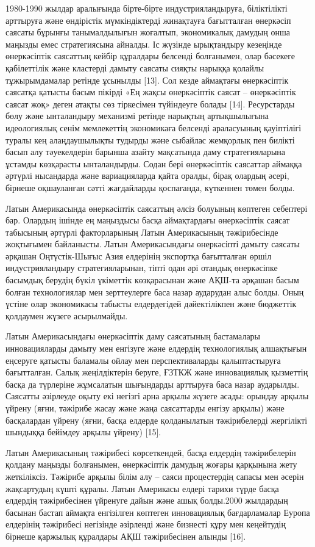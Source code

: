 \begin{multicols}{2}
1980-1990 жылдар аралығында бірте-бірте индустрияландыруға, біліктілікті
арттыруға және өндірістік мүмкіндіктерді жинақтауға бағытталған
өнеркәсіп саясаты бұрынғы танымалдылығын жоғалтып, экономикалық дамудың
онша маңызды емес стратегиясына айналды. Іс жүзінде ырықтандыру
кезеңінде өнеркәсіптік саясаттың кейбір құралдары белсенді болғанымен,
олар бәсекеге қабілеттілік және кластерді дамыту саясаты сияқты нарыққа
қолайлы тұжырымдамалар ретінде ұсынылды {[}13{]}. Сол кезде аймақтағы
өнеркәсіптік саясатқа қатысты басым пікірді «Ең жақсы өнеркәсіптік
саясат -- өнеркәсіптік саясат жоқ» деген атақты сөз тіркесімен
түйіндеуге болады {[}14{]}. Ресурстарды бөлу және ынталандыру механизмі
ретінде нарықтың артықшылығына идеологиялық сенім мемлекеттің
экономикаға белсенді араласуының қауіптілігі туралы кең алаңдаушылықты
тудырды және сыбайлас жемқорлық пен билікті басып алу тәуекелдерін
барынша азайту мақсатында даму стратегияларына ұстамды көзқарасты
ынталандырды. Содан бері өнеркәсіптік саясаттар аймаққа әртүрлі
нысандарда және вариацияларда қайта оралды, бірақ олардың әсері, бірнеше
оқшауланған сәтті жағдайларды қоспағанда, күткеннен төмен болды.

Латын Америкасында өнеркәсіптік саясаттың әлсіз болуының көптеген
себептері бар. Олардың ішінде ең маңыздысы басқа аймақтардағы
өнеркәсіптік саясат табысының әртүрлі факторларының Латын Америкасының
тәжірибесінде жоқтығымен байланысты. Латын Америкасындағы өнеркәсіпті
дамыту саясаты әрқашан Оңтүстік-Шығыс Азия елдерінің экспортқа
бағытталған өршіл индустрияландыру стратегияларынан, тіпті одан әрі
отандық өнеркәсіпке басымдық берудің бүкіл үкіметтік көзқарасынан және
АҚШ-та әрқашан басым болған технологиялар мен зерттеулерге баса назар
аударудан алыс болды. Оның үстіне олар экономикасы табысты елдердегідей
дәйектілікпен және бюджеттік қолдаумен жүзеге асырылмайды.

Латын Америкасындағы өнеркәсіптік даму саясатының бастамалары
инновацияларды дамыту мен енгізуге және елдердің технологиялық
алшақтығын еңсеруге қатысты баламалы ойлау мен перспективаларды
қалыптастыруға бағытталған. Салық жеңілдіктерін беруге, ҒЗТКЖ және
инновациялық қызметтің басқа да түрлеріне жұмсалатын шығындарды
арттыруға баса назар аударылды. Саясатты әзірлеуде оқыту екі негізгі
арна арқылы жүзеге асады: орындау арқылы үйрену (яғни, тәжірибе жасау
және жаңа саясаттарды енгізу арқылы) және басқалардан үйрену (яғни,
басқа елдерде қолданылатын тәжірибелерді жергілікті шындыққа бейімдеу
арқылы үйрену) {[}15{]}.

Латын Америкасының тәжірибесі көрсеткендей, басқа елдердің тәжірибелерін
қолдану маңызды болғанымен, өнеркәсіптік дамудың жоғары қарқынына жету
жеткіліксіз. Тәжірибе арқылы білім алу -- саяси процестердің сапасы мен
әсерін жақсартудың күшті құралы. Латын Америкасы елдері тарихи түрде
басқа елдердің тәжірибесінен үйренуге дайын және ашық болды.2000
жылдардың басынан бастап аймақта енгізілген көптеген инновациялық
бағдарламалар Еуропа елдерінің тәжірибесі негізінде әзірленді және
бизнесті құру мен кеңейтудің бірнеше қаржылық құралдары АҚШ
тәжірибесінен алынды {[}16{]}.


\end{multicols}
